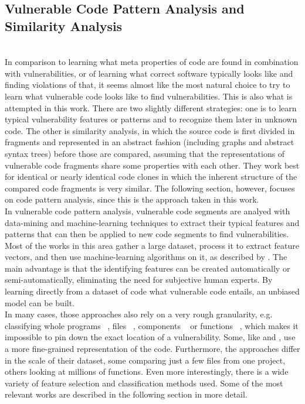 \documentclass[
	a4paper,
	pagesize,
	pdftex,
	12pt,
	twoside, %
	BCOR=5mm, %
	ngerman,
	fleqn,
	final,
	]{scrartcl}
\begin{document}
\subsection{Vulnerable Code Pattern Analysis and Similarity Analysis}\mbox{}\\
In comparison to learning what meta properties of code are found in combination with vulnerabilities, or of learning what correct software typically looks like and finding violations of that, it seems almost like the most natural choice to try to learn what vulnerable code looks like to find vulnerabilities. This is also what is attempted in this work.
There are two slightly different strategies: one is to learn typical vulnerability features or patterns and to recognize them later in unknown code. The other is similarity analysis, in which the source code is first divided in fragments and represented in an abstract fashion (including graphs and abstract syntax trees) before those are compared, assuming that the representations of vulnerable code fragments share some properties with each other. They work best for identical or nearly identical code clones in which the inherent structure of the compared code fragments is very similar\cite{Li.2018}. The following section, however, focuses on code pattern analysis, since this is the approach taken in this work.\\
In vulnerable code pattern analysis, vulnerable code segments are analyed with data-mining and machine-learning techniques to extract their typical features and patterns that can then be applied to new code segments to find vulnerabilities. Most of the works in this area gather a large dataset, process it to extract feature vectors, and then use machine-learning algorithms on it, as described by \citep{Ghaffarian.2017}. The main advantage is that the identifying features can be created automatically or semi-automatically, eliminating the need for subjective human experts. By learning directly from a dataset of code what vulnerable code entails, an unbiased model can be built.\\
In many cases, those approaches also rely on a very rough granularity, e.g. classifying whole programs ~\cite{Grieco.2016}, files ~\cite{Shin.2010}, components ~\cite{Neuhaus.2007} or functions ~\cite{Yamaguchi.2011}, which makes it impossible to pin down the exact location of a vulnerability. Some, like \cite{Li.2018} and \cite{Russell.2018}, use a more fine-grained representation of the code. Furthermore, the approaches differ in the scale of their dataset, some comparing just a few files from one project, others looking at millions of functions. Even more interestingly, there is a wide variety of feature selection and classification methods used. Some of the most relevant works are described in the following section in more detail.\\
\end{document}
